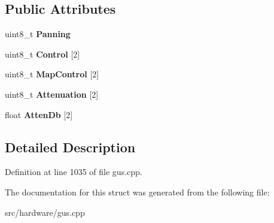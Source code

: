 \subsection*{Public Attributes}
\begin{DoxyCompactItemize}
\item 
\hypertarget{structgus__ICS2101_1_1mixcontrol_a51061e6484c9e123414be0af811b714f}{uint8\-\_\-t {\bfseries Panning}}\label{structgus__ICS2101_1_1mixcontrol_a51061e6484c9e123414be0af811b714f}

\item 
\hypertarget{structgus__ICS2101_1_1mixcontrol_abc998b7038d01a551dbc659027d54f66}{uint8\-\_\-t {\bfseries Control} \mbox{[}2\mbox{]}}\label{structgus__ICS2101_1_1mixcontrol_abc998b7038d01a551dbc659027d54f66}

\item 
\hypertarget{structgus__ICS2101_1_1mixcontrol_a916268f834849e724a87c1f6510bb964}{uint8\-\_\-t {\bfseries Map\-Control} \mbox{[}2\mbox{]}}\label{structgus__ICS2101_1_1mixcontrol_a916268f834849e724a87c1f6510bb964}

\item 
\hypertarget{structgus__ICS2101_1_1mixcontrol_afb5439928a40cd9679b7128298f92702}{uint8\-\_\-t {\bfseries Attenuation} \mbox{[}2\mbox{]}}\label{structgus__ICS2101_1_1mixcontrol_afb5439928a40cd9679b7128298f92702}

\item 
\hypertarget{structgus__ICS2101_1_1mixcontrol_afc8504acb2e1fb3afcc045e255023605}{float {\bfseries Atten\-Db} \mbox{[}2\mbox{]}}\label{structgus__ICS2101_1_1mixcontrol_afc8504acb2e1fb3afcc045e255023605}

\end{DoxyCompactItemize}


\subsection{Detailed Description}


Definition at line 1035 of file gus.\-cpp.



The documentation for this struct was generated from the following file\-:\begin{DoxyCompactItemize}
\item 
src/hardware/gus.\-cpp\end{DoxyCompactItemize}
